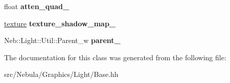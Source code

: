 \begin{DoxyCompactItemize}
\item 
\hypertarget{classNeb_1_1Light_1_1Base_ae5e40a74cc0cadaefe2aad8945d324db}{float {\bfseries atten\-\_\-quad\-\_\-}}\label{classNeb_1_1Light_1_1Base_ae5e40a74cc0cadaefe2aad8945d324db}

\item 
\hypertarget{classNeb_1_1Light_1_1Base_a45d18dc3beeec6a5ae06e33cb2ada2fb}{\hyperlink{classNeb_1_1texture}{texture} {\bfseries texture\-\_\-shadow\-\_\-map\-\_\-}}\label{classNeb_1_1Light_1_1Base_a45d18dc3beeec6a5ae06e33cb2ada2fb}

\item 
\hypertarget{classNeb_1_1Light_1_1Base_a1dc9750f52706e06b03733cf68b2bd1c}{Neb\-::\-Light\-::\-Util\-::\-Parent\-\_\-w {\bfseries parent\-\_\-}}\label{classNeb_1_1Light_1_1Base_a1dc9750f52706e06b03733cf68b2bd1c}

\end{DoxyCompactItemize}


The documentation for this class was generated from the following file\-:\begin{DoxyCompactItemize}
\item 
src/\-Nebula/\-Graphics/\-Light/Base.\-hh\end{DoxyCompactItemize}
